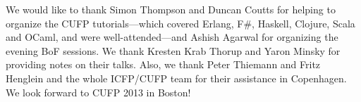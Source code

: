 \documentclass{jfp1}
\begin{document}
We would like to thank Simon Thompson and Duncan Coutts for helping to
organize the CUFP tutorials---which covered Erlang, F\#, Haskell, Clojure, Scala and OCaml, and were well-attended---and Ashish Agarwal for organizing the evening BoF
sessions.  We thank Kresten Krab Thorup and Yaron Minsky for providing
notes on their talks.  Also, we thank Peter Thiemann and Fritz Henglein and the
whole ICFP/CUFP team for their assistance in Copenhagen.  We look
forward to CUFP 2013 in Boston!


\end{document}
